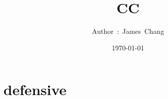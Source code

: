 

\title{CC}
\author{ {\Biohazard} \hspace{1.5mm} \hspace{1.5mm} Author\ :\ James\ Chang}
\date{\today}


\large

\tableofcontents

\chapter{defensive}






